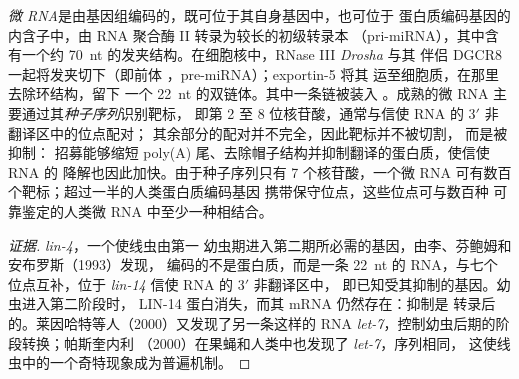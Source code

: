 \begin{definition}[微 RNA]\label{def:b3:rna-regulation:mirna}
\emph{微 RNA}是由基因组编码的，既可位于其自身基因中，也可位于
蛋白质编码基因的内含子中，由 RNA 聚合酶 II 转录为较长的初级转录本
（pri-miRNA），其中含有一个约
\qty{70}{nt} 的发夹结构。在细胞核中，RNase III \emph{Drosha} 与其
伴侣 DGCR8 一起将发夹切下（即前体 ，pre-miRNA）；exportin-5 将其
运至细胞质，在那里  去除环结构，留下
一个 \qty{22}{nt} 的双链体。其中一条链被装入 。成熟的微 RNA
主要通过其\emph{种子序列}识别靶标，
即第 2 至 8 位核苷酸，通常与信使 RNA 的 3$'$ 非翻译区中的位点配对；
其余部分的配对并不完全，因此靶标并不被切割，
而是被抑制： 招募能够缩短
poly(A) 尾、去除帽子结构并抑制翻译的蛋白质，使信使 RNA 的
降解也因此加快。由于种子序列只有 7 个核苷酸，一个微 RNA
可有数百个靶标；超过一半的人类蛋白质编码基因
携带保守位点，这些位点可与数百种
可靠鉴定的人类微 RNA 中至少一种相结合。
\end{definition}

\begin{proof}[证据]
\emph{lin-4}，一个使线虫由第一
幼虫期进入第二期所必需的基因，由李、芬鲍姆和安布罗斯（1993）发现，
编码的不是蛋白质，而是一条 \qty{22}{nt} 的 RNA，与七个
位点互补，位于 \emph{lin-14} 信使 RNA 的 3$'$ 非翻译区中，
即已知受其抑制的基因。幼虫进入第二阶段时，
LIN-14 蛋白消失，而其 mRNA 仍然存在：抑制是
转录后的。莱因哈特等人（2000）又发现了另一条这样的
RNA \emph{let-7}，控制幼虫后期的阶段转换；帕斯奎内利
（2000）在果蝇和人类中也发现了 \emph{let-7}，序列相同，
这使线虫中的一个奇特现象成为普遍机制。
\end{proof}

